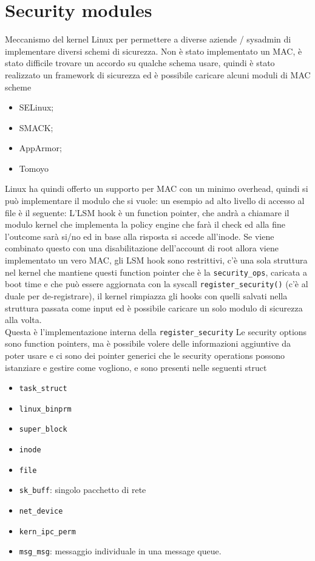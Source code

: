 \documentclass[12pt, oneside]{extbook} %
\begin{document}
\section{Security modules}
Meccanismo del kernel Linux per permettere a diverse aziende / sysadmin di implementare diversi schemi di sicurezza. Non è stato implementato un MAC, è stato difficile trovare un accordo su qualche schema usare, quindi è stato realizzato un framework di sicurezza ed è possibile caricare alcuni moduli di MAC scheme
\begin{itemize}
\item SELinux;
\item SMACK;
\item AppArmor;
\item Tomoyo
\end{itemize}
Linux ha quindi offerto un supporto per MAC con un minimo overhead, quindi si può implementare il modulo che si vuole: un esempio ad alto livello di accesso al file è il seguente:
L'LSM hook è un function pointer, che andrà a chiamare il modulo kernel che implementa la policy engine che farà il check ed alla fine l'outcome sarà si/no ed in base alla risposta si accede all'inode. Se viene combinato questo con una disabilitazione dell'account di root allora viene implementato un vero MAC, gli LSM hook sono restrittivi, c'è una sola struttura nel kernel che mantiene questi function pointer che è la \texttt{security\_ops}, caricata a boot time e che può essere aggiornata con la syscall \texttt{register\_security()} (c'è al duale per de-registrare), il kernel rimpiazza gli hooks con quelli salvati nella struttura passata come input ed è possibile caricare un solo modulo di sicurezza alla volta.\\Questa è l'implementazione interna della \texttt{register\_security}
Le security options sono function pointers, ma è possibile volere delle informazioni aggiuntive da poter usare e ci sono dei pointer generici che le security operations possono istanziare e gestire come vogliono, e sono presenti nelle seguenti struct
\begin{itemize}
\item \texttt{task\_struct}
\item \texttt{linux\_binprm}
\item \texttt{super\_block}
\item \texttt{inode}
\item \texttt{file}
\item \texttt{sk\_buff}: singolo pacchetto di rete
\item \texttt{net\_device}
\item \texttt{kern\_ipc\_perm}
\item \texttt{msg\_msg}: messaggio individuale in una message queue.
\end{itemize}
\end{document}
